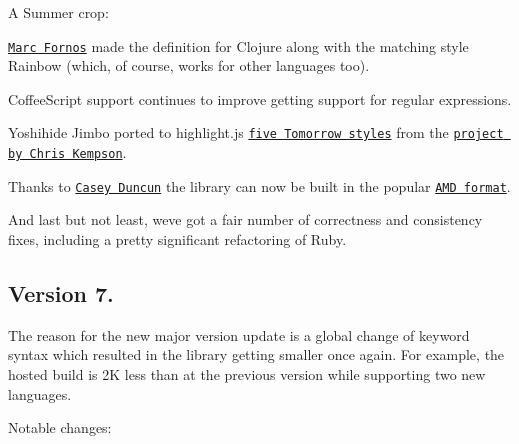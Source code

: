A Summer crop\+:


\begin{DoxyItemize}
\item \href{https://github.com/mfornos}{\tt Marc Fornos} made the definition for Clojure along with the matching style Rainbow (which, of course, works for other languages too).
\item Coffee\+Script support continues to improve getting support for regular expressions.
\item Yoshihide Jimbo ported to highlight.\+js \href{http://jmblog.github.com/color-themes-for-highlightjs/}{\tt five Tomorrow styles} from the \href{https://github.com/ChrisKempson/Tomorrow-Theme}{\tt project by Chris Kempson}.
\item Thanks to \href{https://github.com/caseman}{\tt Casey Duncun} the library can now be built in the popular \href{http://requirejs.org/docs/whyamd.html}{\tt A\+MD format}.
\item And last but not least, we\textquotesingle{}ve got a fair number of correctness and consistency fixes, including a pretty significant refactoring of Ruby.
\end{DoxyItemize}

\subsection*{Version 7.}

The reason for the new major version update is a global change of keyword syntax which resulted in the library getting smaller once again. For example, the hosted build is 2K less than at the previous version while supporting two new languages.

Notable changes\+:


